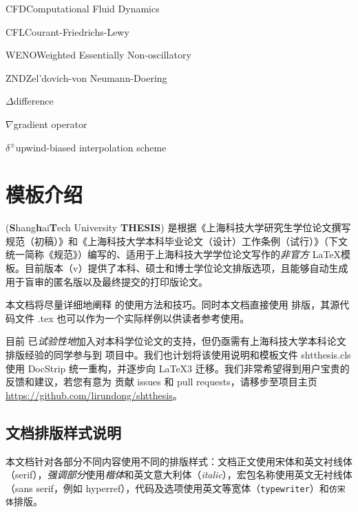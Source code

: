 \documentclass[doctor]{shtthesis}
\begin{document}
\begin{nomenclatures}[缩写]
  \item{CFD}{Computational Fluid Dynamics}
  \item{CFL}{Courant-Friedrichs-Lewy}
  \item{WENO}{Weighted Essentially Non-oscillatory}
  \item{ZND}{Zel'dovich-von Neumann-Doering}
\end{nomenclatures}

\begin{nomenclatures}[算子 \& 说明]
  \item{$\Delta$}{difference}
  \item{$\nabla$}{gradient operator}
  \item{$\delta^{\pm}$}{upwind-biased interpolation scheme}
\end{nomenclatures}
\fi

\mainmatter
\chapter{模板介绍}
\shtthesis{} (\textbf{S}hang\textbf{h}ai\textbf{T}ech University \textbf{THESIS}) 是根据《上海科技大学研究生学位论文撰写规范（初稿）》和《上海科技大学本科毕业论文（设计）工作条例（试行）》（下文统一简称《规范》）编写的、适用于上海科技大学学位论文写作的\emph{非官方} \LaTeX 模板。目前版本（v\version{}）提供了本科、硕士和博士学位论文排版选项，且能够自动生成用于盲审的匿名版以及最终提交的打印版论文。

本文档将尽量详细地阐释 \shtthesis{} 的使用方法和技巧。同时本文档直接使用 \shtthesis{} 排版，其源代码文件 \jobname.tex 也可以作为一个实际样例以供读者参考使用。

目前 \shtthesis{} 已\emph{试验性地}加入对本科学位论文的支持，但仍亟需有上海科技大学本科论文排版经验的同学参与到 \shtthesis{} 项目中。我们也计划将该使用说明和模板文件 shtthesis.cls 使用 \textsf{DocStrip} 统一重构，并逐步向 \LaTeX3 迁移。我们非常希望得到用户宝贵的反馈和建议，若您有意为 \shtthesis{} 贡献 issues 和 pull requests，请移步至项目主页 \url{https://github.com/lirundong/shtthesis}。

\section*{文档排版样式说明}
本文档针对各部分不同内容使用不同的排版样式：文档正文使用宋体和英文衬线体（serif），\emph{强调部分}使用\emph{楷体}和英文意大利体（\emph{italic}），宏包名称使用英文无衬线体（\textsf{sans serif}，例如 \textsf{hyperref}），代码及选项使用英文等宽体（\texttt{typewriter}）和\texttt{仿宋体}排版。
\end{document}
